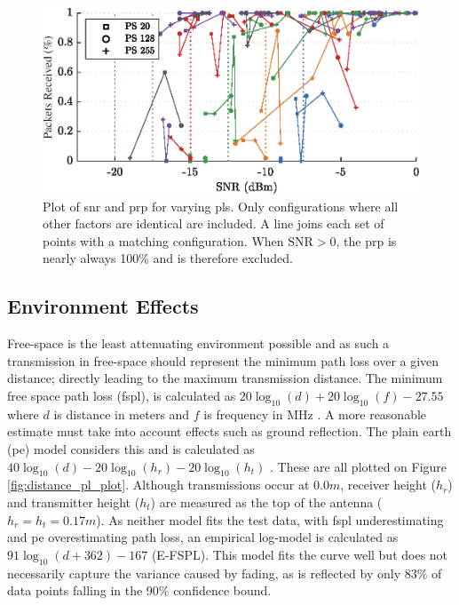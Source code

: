 \begin{figure}[H]
    \centering
   	\includegraphics{Figures/pl_pp_plot}
    \caption[Effect of Packet Length on \ac{snr} and \ac{prp}]{
    Plot of \ac{snr} and \ac{prp} for varying \ac{pl}s. Only configurations where all other factors are identical are included. A line joins each set of points with a matching configuration. When $\text{SNR} > 0$, the \ac{prp} is nearly always 100\% and is therefore excluded.
    }
    \label{fig:pl_pp_plot}
\end{figure}

\subsection{Environment Effects}\label{sec:environment_propagation}
Free-space is the least attenuating environment possible and as such a transmission in free-space should represent the minimum path loss over a given distance; directly leading to the maximum transmission distance. The minimum free space path loss (\ac{fspl}), is calculated as $20\log_{10}(d) + 20\log_{10}(f) - 27.55$ where $d$ is distance in meters and $f$ is frequency in MHz \cite{3YP:ANTENNA_BOOK}. A more reasonable estimate must take into account effects such as ground reflection. The plain earth (\ac{pe}) model considers this and is calculated as $40\log_{10}(d) - 20\log_{10}(h_r) - 20\log_{10}(h_t)$ \cite{3YP:COMBINING_MODELS}. These are all plotted on Figure \ref{fig:distance_pl_plot}. Although transmissions occur at $0.0m$, receiver height ($h_r$) and transmitter height ($h_t$) are measured as the top of the antenna ($h_r = h_t = 0.17m$). As neither model fits the test data, with \ac{fspl} underestimating and \ac{pe} overestimating path loss, an empirical log-model is calculated as $91\log_{10}(d+362)-167$ (E-FSPL). This model fits the curve well but does not necessarily capture the variance caused by fading, as is reflected by only 83\% of data points falling in the 90\% confidence bound.

